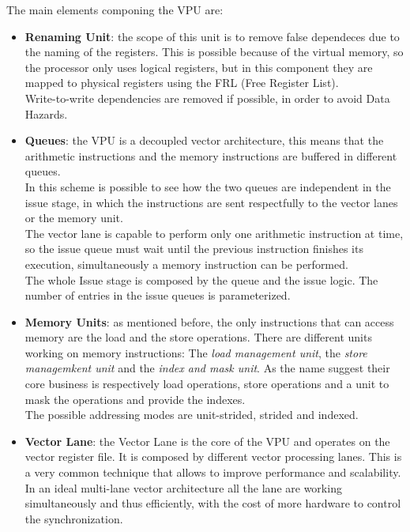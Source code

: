 The main elements componing the VPU are:
\begin{itemize}
    \item \textbf{Renaming Unit}: the scope of this unit is to remove false dependeces due to the naming of the registers. This is possible because of the virtual memory, so the processor only uses logical registers, but in this component they are mapped to physical registers using the FRL (Free Register List).\\
    Write-to-write dependencies are removed if possible, in order to avoid Data Hazards.\\
 
    \item \textbf{Queues}: the VPU is a decoupled vector architecture, this means that the arithmetic instructions and the memory instructions are buffered in different queues.\\
    In this scheme is possible to see how the two queues are independent in the issue stage, in which the instructions are sent respectfully to the vector lanes or the memory unit.\\
    The vector lane is capable to perform only one arithmetic instruction at time, so the issue queue must wait until the previous instruction finishes its execution, simultaneously a memory instruction can be performed.\\
    The whole Issue stage is composed by the queue and the issue logic. The number of entries in the issue queues is parameterized.
    
    \item \textbf{Memory Units}: as mentioned before, the only instructions that can access memory are the load and the store operations. There are different units working on memory instructions: The \emph{load management unit}, the \emph{store managemkent unit} and the \emph{index and mask unit}. As the name suggest their core business is respectively load operations, store operations and a unit to mask the operations and provide the indexes.\\
    The possible addressing modes are unit-strided, strided and indexed.\\
    

    
    \item \textbf{Vector Lane}: the Vector Lane is the core of the VPU and operates on the vector register file. It is composed by different vector processing lanes. This is a very common technique that allows to improve performance and scalability.\\
    In an ideal multi-lane vector architecture all the lane are working simultaneously and thus efficiently, with the cost of more hardware to control the synchronization.\\
    

\end{itemize}
